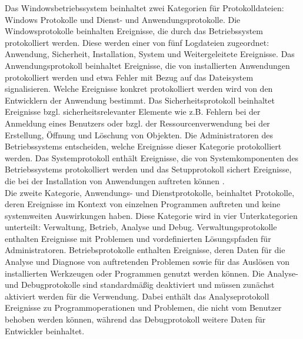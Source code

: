 Das Windowsbetriebssystem beinhaltet zwei Kategorien für Protokolldateien: Windows Protokolle und Dienst- und Anwendungsprotokolle. 
Die Windowsprotokolle beinhalten Ereignisse, die durch das Betriebssystem protokolliert werden. Diese werden einer von fünf Logdateien zugeordnet: Anwendung, Sicherheit, Installation, System und Weitergeleitete Ereignisse.
Das Anwendungsprotokoll beinhaltet Ereignisse, die von installierten Anwendungen protokolliert werden und etwa Fehler mit Bezug auf das Dateisystem signalisieren. Welche Ereignisse konkret protokolliert werden wird von den Entwicklern der Anwendung bestimmt. 
Das Sicherheitsprotokoll beinhaltet Ereignisse bzgl. sicherheitsrelevanter Elemente wie z.B. Fehlern bei der Anmeldung eines Benutzers oder bzgl. der Ressourcenverwendung bei der Erstellung, Öffnung und Löschung von Objekten. Die Administratoren des Betriebssystems entscheiden, welche Ereignisse dieser Kategorie protokolliert werden. 
Das Systemprotokoll enthält Ereignisse, die von Systemkomponenten des Betriebssystems protokolliert werden und das Setupprotokoll sichert Ereignisse, die bei der Installation von Anwendungen auftreten können \citep{MS2}.\\

Die zweite Kategorie, Anwendungs- und Dienstprotokolle, beinhaltet Protokolle, deren Ereignisse im Kontext von einzelnen Programmen auftreten und keine systemweiten Auswirkungen haben. Diese Kategorie wird in vier Unterkategorien unterteilt: Verwaltung, Betrieb, Analyse und Debug. Verwaltungsprotokolle enthalten Ereignisse mit Problemen und vordefinierten Lösungspfaden für Administratoren. Betriebsprotokolle enthalten Ereignisse, deren Daten für die Analyse und Diagnose von auftretenden Problemen sowie für das Auslösen von installierten Werkzeugen oder Programmen genutzt werden können. Die Analyse- und Debugprotokolle sind standardmäßig deaktiviert und müssen zunächst aktiviert werden für die Verwendung. Dabei enthält das Analyseprotokoll Ereignisse zu Programmoperationen und Problemen, die nicht vom Benutzer behoben werden können, während das Debugprotokoll weitere Daten für Entwickler beinhaltet.

